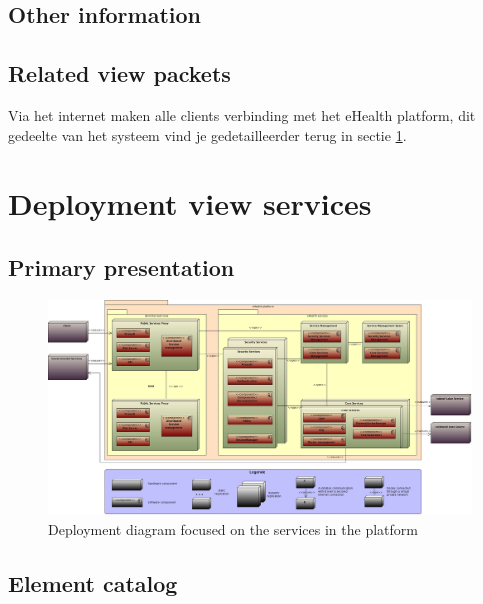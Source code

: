 \documentclass[a4paper,10pt]{article}
\begin{document}
\subsection{Other information}

\subsection{Related view packets}
Via het internet maken alle clients verbinding met het eHealth platform, dit gedeelte van het systeem vind je gedetailleerder terug in sectie \ref{sec:deployment_services}.

\clearpage
\section{Deployment view services}
\label{sec:deployment_services}

\subsection{Primary presentation}

\begin{figure}[!h]
  \includegraphics[width=\textwidth]{../images/deployment_services.jpg}
    \caption{Deployment diagram focused on the services in the platform}
\end{figure}

\subsection{Element catalog}
\end{document}
